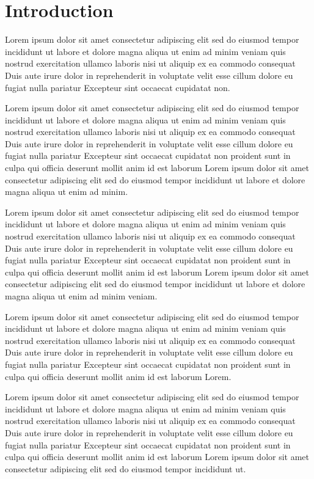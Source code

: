 \section{Introduction}

Lorem ipsum dolor sit amet consectetur adipiscing elit sed do eiusmod tempor incididunt ut labore et dolore magna aliqua ut enim ad minim veniam quis nostrud exercitation ullamco laboris nisi ut aliquip ex ea commodo consequat Duis aute irure dolor in reprehenderit in voluptate velit esse cillum dolore eu fugiat nulla pariatur Excepteur sint occaecat cupidatat non. \cite{openflow-intro,openflow-spec}

Lorem ipsum dolor sit amet consectetur adipiscing elit sed do eiusmod tempor incididunt ut labore et dolore magna aliqua ut enim ad minim veniam quis nostrud exercitation ullamco laboris nisi ut aliquip ex ea commodo consequat Duis aute irure dolor in reprehenderit in voluptate velit esse cillum dolore eu fugiat nulla pariatur Excepteur sint occaecat cupidatat non proident sunt in culpa qui officia deserunt mollit anim id est laborum Lorem ipsum dolor sit amet consectetur adipiscing elit sed do eiusmod tempor incididunt ut labore et dolore magna aliqua ut enim ad minim.

Lorem ipsum dolor sit amet consectetur adipiscing elit sed do eiusmod tempor incididunt ut labore et dolore magna aliqua ut enim ad minim veniam quis nostrud exercitation ullamco laboris nisi ut aliquip ex ea commodo consequat Duis aute irure dolor in reprehenderit in voluptate velit esse cillum dolore eu fugiat nulla pariatur Excepteur sint occaecat cupidatat non proident sunt in culpa qui officia deserunt mollit anim id est laborum Lorem ipsum dolor sit amet consectetur adipiscing elit sed do eiusmod tempor incididunt ut labore et dolore magna aliqua ut enim ad minim veniam.

Lorem ipsum dolor sit amet consectetur adipiscing elit sed do eiusmod tempor incididunt ut labore et dolore magna aliqua ut enim ad minim veniam quis nostrud exercitation ullamco laboris nisi ut aliquip ex ea commodo consequat Duis aute irure dolor in reprehenderit in voluptate velit esse cillum dolore eu fugiat nulla pariatur Excepteur sint occaecat cupidatat non proident sunt in culpa qui officia deserunt mollit anim id est laborum Lorem. \cite{mininet}

Lorem ipsum dolor sit amet consectetur adipiscing elit sed do eiusmod tempor incididunt ut labore et dolore magna aliqua ut enim ad minim veniam quis nostrud exercitation ullamco laboris nisi ut aliquip ex ea commodo consequat Duis aute irure dolor in reprehenderit in voluptate velit esse cillum dolore eu fugiat nulla pariatur Excepteur sint occaecat cupidatat non proident sunt in culpa qui officia deserunt mollit anim id est laborum Lorem ipsum dolor sit amet consectetur adipiscing elit sed do eiusmod tempor incididunt ut.
